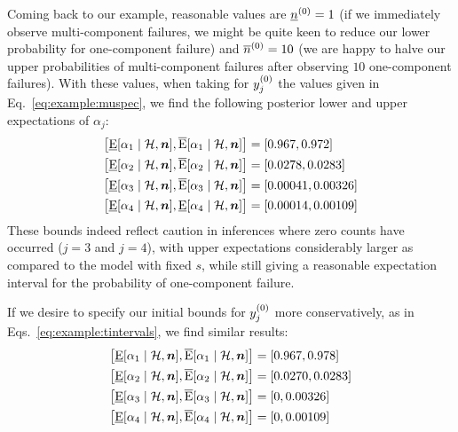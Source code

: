 Coming back to our example, reasonable values are $\underline{n}^{(0)}=1$
(if we immediately observe multi-component failures,
we might be quite keen to reduce our lower probability for one-component failure)
and $\overline{n}^{(0)}=10$ (we are happy to halve our upper probabilities of
multi-component failures after observing $10$ one-component failures).
With these values, when taking for $y^{(0)}_j$ the values given in Eq.~\eqref{eq:example:muspec},
we find the following posterior lower and upper expectations of $\alpha_j$:
\begin{subequations}
\begin{align*}
  \big[
  \El[\alpha_1\mid\mathcal{H},\vec{n}] %
  ,
  \Eu[\alpha_1\mid\mathcal{H},\vec{n}] %
  \big]
  &=
  [
  0.967
  ,
  0.972
  ]
  \\
  \big[
  \El[\alpha_2\mid\mathcal{H},\vec{n}] %
  ,
  \Eu[\alpha_2\mid\mathcal{H},\vec{n}] %
  \big]
  &=
  [
  0.0278
  ,
  0.0283
  ]
  \\
  \big[
  \El[\alpha_3\mid\mathcal{H},\vec{n}] %
  ,
  \Eu[\alpha_3\mid\mathcal{H},\vec{n}] %
  \big]
  &=
  [
  0.00041
  ,
  0.00326
  ]
  \\
  \big[
  \El[\alpha_4\mid\mathcal{H},\vec{n}] %
  ,
  \El[\alpha_4\mid\mathcal{H},\vec{n}] %
  \big]
  &=
  [
  0.00014
  ,
  0.00109
  ]
\end{align*}
\end{subequations}
These bounds indeed reflect caution in inferences where zero counts have occurred ($j=3$ and $j=4$),
with upper expectations considerably larger as compared to the model with fixed $s$,
while still giving a reasonable expectation interval for the probability of one-component failure.

If we desire to specify our initial bounds for $y^{(0)}_j$ more conservatively,
as in Eqs.~\eqref{eq:example:tintervals}, we find similar results:
\begin{subequations}%
\begin{align*}
  \big[
  \El[\alpha_1\mid\mathcal{H},\vec{n}] %
  ,
  \Eu[\alpha_1\mid\mathcal{H},\vec{n}] %
  \big]
  &=
  [
  0.967
  ,
  0.978
  ]
  \\
  \big[
  \El[\alpha_2\mid\mathcal{H},\vec{n}] %
  ,
  \Eu[\alpha_2\mid\mathcal{H},\vec{n}] %
  \big]
  &=
  [
  0.0270
  ,
  0.0283
  ]
  \\
  \big[
  \El[\alpha_3\mid\mathcal{H},\vec{n}] %
  ,
  \Eu[\alpha_3\mid\mathcal{H},\vec{n}] %
  \big]
  &=
  [
  0
  ,
  0.00326
  ]
  \\
  \big[
  \El[\alpha_4\mid\mathcal{H},\vec{n}] %
  ,
  \Eu[\alpha_4\mid\mathcal{H},\vec{n}] %
  \big]
  &=
  [
  0
  ,
  0.00109
  ]
\end{align*}
\end{subequations}

